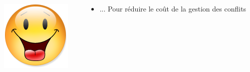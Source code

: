 \documentclass[xcolor={x11names,svgnames}]{beamer}
\begin{document}
\begin{frame}[label=idea1]
  \begin{columns}[c]
    \begin{column}{.1\textwidth}
      \vspace{3mm}
      \includegraphics[width=\textwidth]{Content.png}
    \end{column}
    
    \begin{column}{.9\textwidth}
      \begin{itemize}
      \item ... Pour réduire le coût de la gestion des conflits
      \end{itemize}
    \end{column}
  \end{columns}  
\end{frame}

\end{document}
